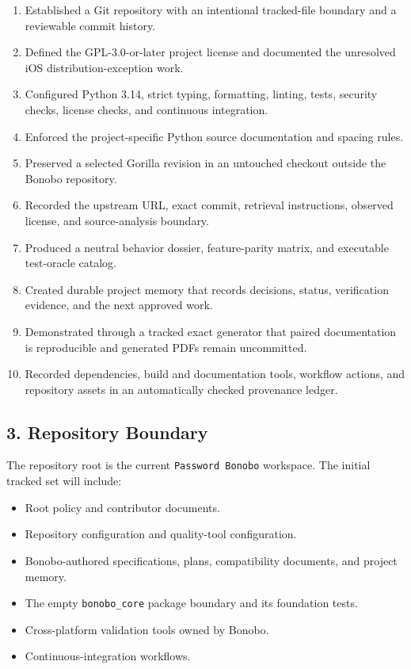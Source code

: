 \documentclass[
  letterpaper,
]{article}
\newcommand{\passthrough}[1]{#1}
\providecommand{\tightlist}{%
  \setlength{\itemsep}{0pt}\setlength{\parskip}{0pt}}
\begin{document}
\begin{enumerate}
\def\labelenumi{\arabic{enumi}.}
\tightlist
\item
  Established a Git repository with an intentional tracked-file boundary and a reviewable commit history.
\item
  Defined the GPL-3.0-or-later project license and documented the unresolved iOS distribution-exception work.
\item
  Configured Python 3.14, strict typing, formatting, linting, tests, security checks, license checks, and continuous
  integration.
\item
  Enforced the project-specific Python source documentation and spacing rules.
\item
  Preserved a selected Gorilla revision in an untouched checkout outside the Bonobo repository.
\item
  Recorded the upstream URL, exact commit, retrieval instructions, observed license, and source-analysis boundary.
\item
  Produced a neutral behavior dossier, feature-parity matrix, and executable test-oracle catalog.
\item
  Created durable project memory that records decisions, status, verification evidence, and the next approved work.
\item
  Demonstrated through a tracked exact generator that paired documentation is reproducible and generated PDFs remain
  uncommitted.
\item
  Recorded dependencies, build and documentation tools, workflow actions, and repository assets in an automatically
  checked provenance ledger.
\end{enumerate}

\subsection{3. Repository Boundary}\label{3-repository-boundary}

The repository root is the current \passthrough{\lstinline!Password Bonobo!} workspace. The initial tracked set will
include:

\begin{itemize}
\tightlist
\item
  Root policy and contributor documents.
\item
  Repository configuration and quality-tool configuration.
\item
  Bonobo-authored specifications, plans, compatibility documents, and project memory.
\item
  The empty \nolinkurl{bonobo_core} package boundary and its foundation tests.
\item
  Cross-platform validation tools owned by Bonobo.
\item
  Continuous-integration workflows.
\end{itemize}
\end{document}
